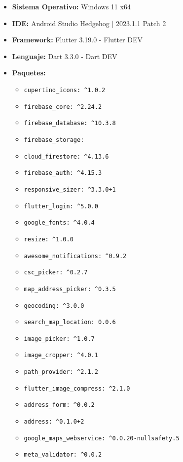 \documentclass[a4paper, 12pt]{article}
\begin{document}
\begin{itemize}[noitemsep]
	\item \textbf{Sistema Operativo:} Windows 11 x64
	\item \textbf{IDE:} Android Studio Hedgehog | 2023.1.1 Patch 2 \cite{hedgehog}
	\item \textbf{Framework:} Flutter 3.19.0 -  Flutter DEV \cite{flutter_dev}
	\item \textbf{Lenguaje:} Dart 3.3.0 - Dart DEV \cite{dart_dev}
	\item \textbf{Paquetes:}
		\begin{itemize}[noitemsep]
		  \item \texttt{cupertino\_icons: \^{}1.0.2}
		  \item \texttt{firebase\_core: \^{}2.24.2}
		  \item \texttt{firebase\_database: \^{}10.3.8}
		  \item \texttt{firebase\_storage:}
		  \item \texttt{cloud\_firestore: \^{}4.13.6}
		  \item \texttt{firebase\_auth: \^{}4.15.3}
		  \item \texttt{responsive\_sizer: \^{}3.3.0+1}
		  \item \texttt{flutter\_login: \^{}5.0.0}
		  \item \texttt{google\_fonts: \^{}4.0.4}
		  \item \texttt{resize: \^{}1.0.0}
		  \item \texttt{awesome\_notifications: \^{}0.9.2}
		  \item \texttt{csc\_picker: \^{}0.2.7}
		  \item \texttt{map\_address\_picker: \^{}0.3.5}
		  \item \texttt{geocoding: \^{}3.0.0}
		  \item \texttt{search\_map\_location: 0.0.6}
		  \item \texttt{image\_picker: \^{}1.0.7}
		  \item \texttt{image\_cropper: \^{}4.0.1}
		  \item \texttt{path\_provider: \^{}2.1.2}
		  \item \texttt{flutter\_image\_compress: \^{}2.1.0}
		  \item \texttt{address\_form: \^{}0.0.2}
		  \item \texttt{address: \^{}0.1.0+2}
		  \item \texttt{google\_maps\_webservice: \^{}0.0.20-nullsafety.5}
		  \item \texttt{meta\_validator: \^{}0.0.2}

\end{itemize}
\end{itemize}
\end{document}
